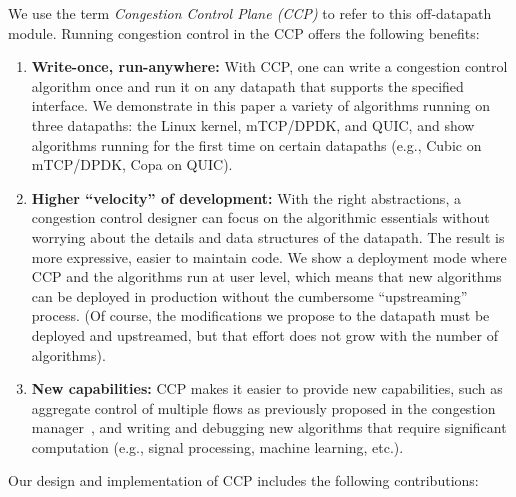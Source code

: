 We use the term {\em Congestion Control Plane (CCP)} to refer to this off-datapath module. Running congestion control in the CCP offers the following benefits:
\begin{enumerate}
    \item {\bf Write-once, run-anywhere:} With CCP, one can write a congestion control algorithm once and run it on any datapath that supports the specified interface. We demonstrate in this paper a variety of algorithms running on three datapaths: the Linux kernel, mTCP/DPDK, and QUIC, and show algorithms running for the first time on certain datapaths (e.g., Cubic on mTCP/DPDK, Copa on QUIC).
    
    \item {\bf Higher ``velocity'' of development:} With the right abstractions, a congestion control designer can focus on the algorithmic essentials without worrying about the details and data structures of the datapath. The result is more expressive, easier to maintain code. We show a deployment mode where CCP and the algorithms run at user level, which means that new algorithms can be deployed in production without the cumbersome ``upstreaming'' process. (Of course, the modifications we propose to the datapath must be deployed and upstreamed, but that effort does not grow with the number of algorithms).
    
    \item {\bf New capabilities:} CCP makes it easier to provide new capabilities, such as aggregate control of multiple flows as previously proposed in the congestion manager~\cite{cm}, and writing and debugging new algorithms that require significant computation (e.g., signal processing, machine learning, etc.).
\end{enumerate}

Our design and implementation of CCP includes the following contributions: 

